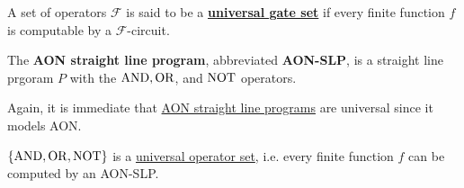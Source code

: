   \begin{definition}
    \label{def:universal-operator-set}
    A set of operators $\mathcal{F}$ is said to be a \textbf{\hyperref[def:universal-gate-set]{universal gate set}} if every finite function $f$ is computable by a $\mathcal{F}$-circuit. 
  \end{definition}

  \begin{definition}
    \label{def:aon-straight-line-program}
    The \textbf{AON straight line program}, abbreviated \textbf{AON-SLP}, is a straight line prgoram $P$ with the $\operatorname{AND}, \operatorname{OR}$, and $\operatorname{NOT}$ operators. 
  \end{definition}

  Again, it is immediate that \hyperref[def:aon-straight-line-program]{AON straight line programs} are universal since it models AON. 

  \begin{theorem}
    \label{thm:aon-slp}
    $\{\operatorname{AND}, \operatorname{OR}, \operatorname{NOT}\}$ is a \hyperref[def:universal-operator-set]{universal operator set}, i.e. every finite function $f$ can be computed by an AON-SLP.
  \end{theorem}

